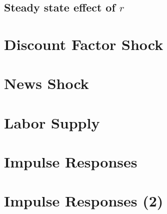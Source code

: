 \documentclass[11pt]{amsart}
\begin{document}
\subsection{Steady state effect of $r$}

\section{Discount Factor Shock}
\section{News Shock}
\section{Labor Supply}
\section{Impulse Responses}
\section{Impulse Responses (2)}
\end{document}
